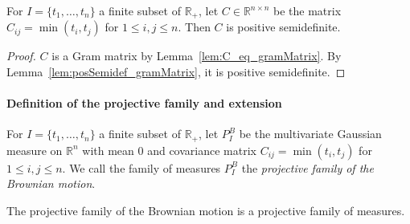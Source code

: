 \begin{lemma}\label{lem:posSemidef_brownianCov}
  \leanok
For $I = \{t_1, \ldots, t_n\}$ a finite subset of $\mathbb{R}_+$, let $C \in \mathbb{R}^{n \times n}$ be the matrix $C_{ij} = \min(t_i, t_j)$ for $1 \leq i,j \leq n$.
Then $C$ is positive semidefinite.
\end{lemma}

\begin{proof}\leanok
$C$ is a Gram matrix by Lemma~\ref{lem:C_eq_gramMatrix}.
By Lemma~\ref{lem:posSemidef_gramMatrix}, it is positive semidefinite.
\end{proof}


\paragraph{Definition of the projective family and extension}

\begin{definition}\label{def:gaussianProjectiveFamily}
  \leanok
For $I = \{t_1, \ldots, t_n\}$ a finite subset of $\mathbb{R}_+$, let $P^B_I$ be the multivariate Gaussian measure on $\mathbb{R}^n$ with mean $0$ and covariance matrix $C_{ij} = \min(t_i, t_j)$ for $1 \leq i,j \leq n$.
We call the family of measures $P^B_I$ the \emph{projective family of the Brownian motion}.
\end{definition}


\begin{lemma}\label{lem:isProjectiveMeasureFamily_gaussianProjectiveFamily}
  \leanok
The projective family of the Brownian motion is a projective family of measures.
\end{lemma}

